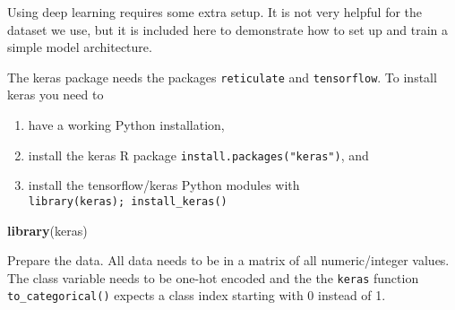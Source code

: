 \documentclass[
  notitlepage]{book}
\newenvironment{Shaded}{\begin{snugshade}}{\end{snugshade}}
\newcommand{\KeywordTok}[1]{\textcolor[rgb]{0.13,0.29,0.53}{\textbf{#1}}}
\newcommand{\NormalTok}[1]{#1}
\providecommand{\tightlist}{%
  \setlength{\itemsep}{0pt}\setlength{\parskip}{0pt}}
\begin{document}
Using deep learning requires some extra setup. It is not very helpful
for the dataset we use, but it is included here to demonstrate how to set up
and train a simple model architecture.

The keras package needs the packages \texttt{reticulate} and \texttt{tensorflow}. To
install keras you need to

\begin{enumerate}
\def\labelenumi{\arabic{enumi}.}
\tightlist
\item
  have a working Python installation,
\item
  install the keras R package \texttt{install.packages("keras")}, and
\item
  install the tensorflow/keras Python modules with
  \texttt{library(keras);\ install\_keras()}
\end{enumerate}

\begin{Shaded}
\begin{Highlighting}[]
\KeywordTok{library}\NormalTok{(keras)}
\end{Highlighting}
\end{Shaded}

Prepare the data. All data needs to be in a matrix of all
numeric/integer values. The class variable needs to be one-hot encoded and the
the \texttt{keras} function \texttt{to\_categorical()} expects a class index starting with 0
instead of 1.
\end{document}
